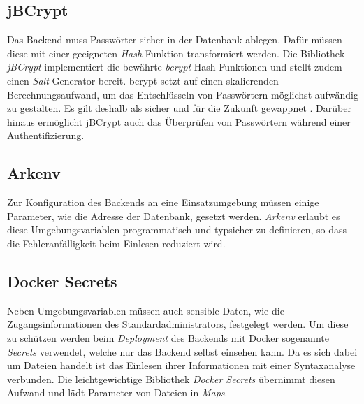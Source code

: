 \subsection{jBCrypt}
\label{subsec:backend:bibs:jbcrypt}
Das Backend muss Passwörter sicher in der Datenbank ablegen.
Dafür müssen diese mit einer geeigneten \textit{Hash}-Funktion transformiert werden.
Die Bibliothek \textit{jBCrypt} implementiert die bewährte  \textit{bcrypt}-Hash-Funktionen und stellt zudem einen \textit{Salt}-Generator bereit.
bcrypt setzt auf einen skalierenden Berechnungsaufwand, um das Entschlüsseln von Passwörtern möglichst aufwändig zu gestalten.
Es gilt deshalb als sicher und für die Zukunft gewappnet \autocite{bcrypt}.
Darüber hinaus ermöglicht jBCrypt auch das Überprüfen von Passwörtern während einer Authentifizierung.

\subsection{Arkenv}
\label{subsec:backend:bibs:arkenv}
Zur Konfiguration des Backends an eine Einsatzumgebung müssen einige Parameter, wie die Adresse der Datenbank, gesetzt werden.
\textit{Arkenv} erlaubt es diese Umgebungsvariablen programmatisch und typsicher zu definieren, so dass die Fehleranfälligkeit beim Einlesen reduziert wird.

\subsection{Docker Secrets}
\label{subsec:backend:bibs:dockersecrets}
Neben Umgebungsvariablen müssen auch sensible Daten, wie die Zugangsinformationen des Standardadministrators, festgelegt werden.
Um diese zu schützen werden beim \textit{Deployment} des Backends mit Docker sogenannte \textit{Secrets} verwendet, welche nur das Backend selbst einsehen kann.
Da es sich dabei um Dateien handelt ist das Einlesen ihrer Informationen mit einer Syntaxanalyse verbunden.
Die leichtgewichtige Bibliothek \textit{Docker Secrets} übernimmt diesen Aufwand und lädt Parameter von Dateien in \textit{Maps}.

